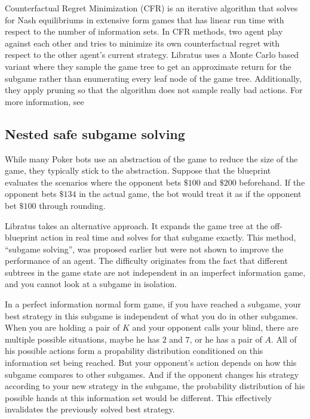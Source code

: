 \documentclass[10pt,a4paper]{article}
\begin{document}
Counterfactual Regret Minimization (CFR) is an iterative algorithm that solves for Nash equilibriums in extensive form games that has linear run time with respect to the number of information sets. In CFR methods, two agent play against each other and tries to minimize its own counterfactual regret with respect to the other agent's current strategy. Libratus uses a Monte Carlo based variant where they sample the game tree to get an approximate return for the subgame rather than enumerating every leaf node of the game tree. Additionally, they apply pruning so that the algorithm does not sample really bad actions. For more information, see~\cite{zinkevich2008regret, johanson2012efficient}

\subsection{Nested safe subgame solving}
While many Poker bots use an abstraction of the game to reduce the size of the game, they typically stick to the abstraction. Suppose that the blueprint evaluates the scenarios where the opponent bets $\$100$ and $\$200$ beforehand. If the opponent bets $\$134$ in the actual game, the bot would treat it as if the opponent bet $\$100$ through rounding.

Libratus takes an alternative approach. It expands the game tree at the off-blueprint action in real time and solves for that subgame exactly. This method, ``subgame solving'', was proposed earlier but were not shown to improve the performance of an agent. The difficulty originates from the fact that different subtrees in the game state are not independent in an imperfect information game, and you cannot look at a subgame in isolation.

In a perfect information normal form game, if you have reached a subgame, your best strategy in this subgame is independent of what you do in other subgames. When you are holding a pair of $K$ and your opponent calls your blind, there are multiple possible situations, maybe he has $2$ and $7$, or he has a pair of $A$. All of his possible actions form a propability distribution conditioned on this information set being reached. But your opponent's action depends on how this subgame compares to other subgames. And if the opponent changes his strategy according to your new strategy in the subgame, the probability distribution of his possible hands at this information set would be different. This effectively invalidates the previously solved best strategy.
\end{document}
